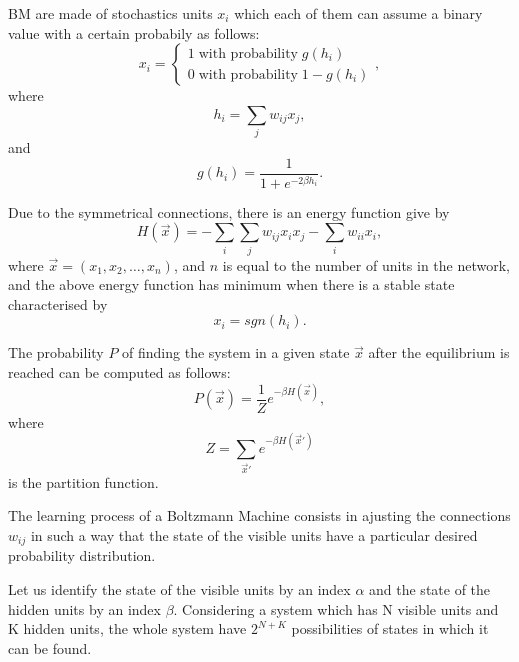 BM are made of stochastics units $x_{i}$ which each of them can assume a binary value with a certain probabily as follows:
\begin{equation}
  x_{i} =
    \begin{cases}
      1 \; \text{with probability} \; g(h_{i}) \\
      0 \; \text{with probability} \; 1 - g(h_{i})
    \end{cases},
  \label{eq:eq1}
\end{equation}
where
\begin{equation}
  h_{i} = \sum_{j}w_{ij}x_{j},
  \label{eq:eq2}
\end{equation}
and
\begin{equation}
  g(h_{i}) = \frac{1}{1 + e^{-2 \beta h_{i}}}.
  \label{eq:eq3}
\end{equation}

Due to the symmetrical connections, there is an energy function give by
\begin{equation}
  H(\vec{x}) = - \sum_{i} \sum_{j} w_{ij}x_{i}x_{j} - \sum_{i} w_{ii}x_{i},
  \label{eq:eq4}
\end{equation}
where $\vec{x} = (x_{1}, x_{2}, \dots, x_{n})$, and $n$ is equal to the number of units in the network, and the above energy function has minimum when there is a stable state characterised by
\begin{equation}
  x_{i} = sgn(h_{i}).
  \label{eq:eq5}
\end{equation}

The probability $P$ of finding the system in a given state $\vec{x}$ after the equilibrium is reached can be computed as follows:
\begin{equation}
  P(\vec{x}) = \frac{1}{Z} e^{- \beta H(\vec{x})},
  \label{eq:eq6}
\end{equation}
where
\begin{equation}
  Z = \sum_{\vec{x}'} e^{- \beta H(\vec{x}')}
  \label{eq:eq7}
\end{equation}
is the partition function.

The learning process of a Boltzmann Machine consists in ajusting the connections $w_{ij}$ in such a way that the state of the visible units have a particular desired probability distribution.

Let us identify the state of the visible units by an index $\alpha$ and the state of the hidden units by an index $\beta$. Considering a system which has N visible units and K hidden units, the whole system have $2^{N + K}$ possibilities of states in which it can be found.

